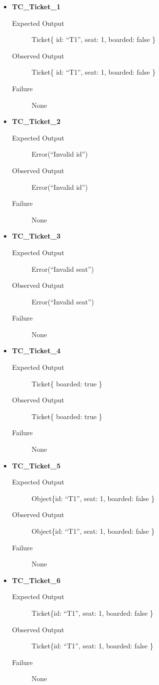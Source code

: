 \documentclass[11pt]{article}
\begin{document}
\begin{itemize}
\item \textbf{TC\_Ticket\_1}
\begin{description}
\item[{Expected Output}] Ticket\{ id: “T1”, seat: 1, boarded: false \}
\item[{Observed Output}] Ticket\{ id: “T1”, seat: 1, boarded: false \}
\item[{Failure}] None
\end{description}

\item \textbf{TC\_Ticket\_2}
\begin{description}
\item[{Expected Output}] Error(“Invalid id”)
\item[{Observed Output}] Error(“Invalid id”)
\item[{Failure}] None
\end{description}

\item \textbf{TC\_Ticket\_3}
\begin{description}
\item[{Expected Output}] Error(“Invalid seat”)
\item[{Observed Output}] Error(“Invalid seat”)
\item[{Failure}] None
\end{description}

\item \textbf{TC\_Ticket\_4}
\begin{description}
\item[{Expected Output}] Ticket\{ boarded: true \}
\item[{Observed Output}] Ticket\{ boarded: true \}
\item[{Failure}] None
\end{description}

\item \textbf{TC\_Ticket\_5}
\begin{description}
\item[{Expected Output}] Object\{id: “T1”, seat: 1, boarded: false \}
\item[{Observed Output}] Object\{id: “T1”, seat: 1, boarded: false \}
\item[{Failure}] None
\end{description}

\item \textbf{TC\_Ticket\_6}
\begin{description}
\item[{Expected Output}] Ticket\{id: “T1”, seat: 1, boarded: false \}
\item[{Observed Output}] Ticket\{id: “T1”, seat: 1, boarded: false \}
\item[{Failure}] None
\end{description}


\end{itemize}
\end{document}
